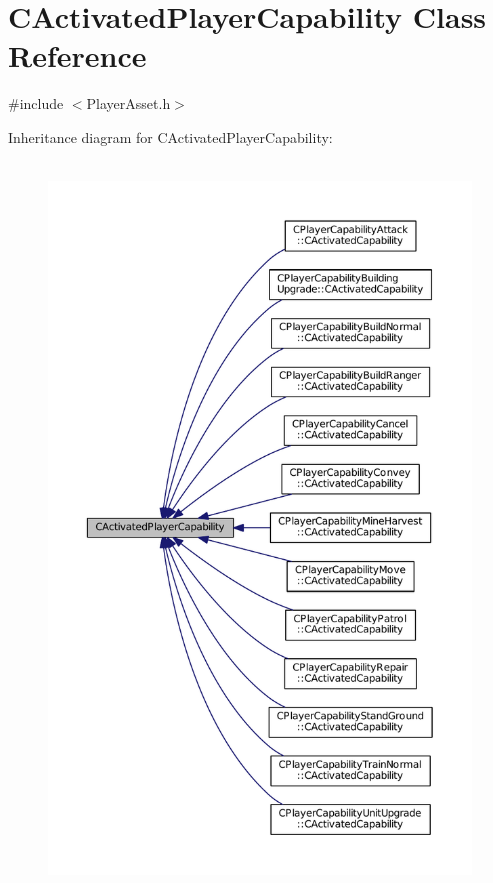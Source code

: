 \hypertarget{classCActivatedPlayerCapability}{}\section{C\+Activated\+Player\+Capability Class Reference}
\label{classCActivatedPlayerCapability}


{\ttfamily \#include $<$Player\+Asset.\+h$>$}



Inheritance diagram for C\+Activated\+Player\+Capability\+:\nopagebreak
\begin{figure}[H]
\begin{center}
\leavevmode
\includegraphics[height=550pt]{classCActivatedPlayerCapability__inherit__graph}
\end{center}
\end{figure}
